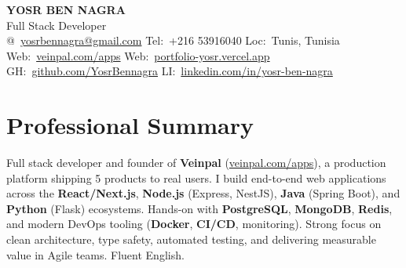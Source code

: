 \documentclass[10pt,a4paper]{article}
\makeatletter
\newcommand{\faEnvelope}{@}
\newcommand{\faPhone}{Tel:}
\newcommand{\faMapMarker}{Loc:}
\newcommand{\faGlobe}{Web:}
\newcommand{\faGithub}{GH:}
\newcommand{\faLinkedin}{LI:}
\makeatother
\begin{document}
\begin{center}
  {\LARGE\bfseries\color{primary} YOSR BEN NAGRA}\\[4pt]
  {\normalsize\color{accent} Full Stack Developer}\\[5pt]
  {\footnotesize
    \faEnvelope\ \href{mailto:yosrbennagra@gmail.com}{yosrbennagra@gmail.com} \;\textbar\;
    \faPhone\ +216 53916040 \;\textbar\;
    \faMapMarker\ Tunis, Tunisia \\[2pt]
    \faGlobe\ \href{https://veinpal.com/apps}{veinpal.com/apps} \;\textbar\;
    \faGlobe\ \href{https://portfolio-yosr.vercel.app/en}{portfolio-yosr.vercel.app} \;\textbar\;
    \faGithub\ \href{https://github.com/YosrBennagra}{github.com/YosrBennagra} \;\textbar\;
    \faLinkedin\ \href{https://www.linkedin.com/in/yosr-ben-nagra/}{linkedin.com/in/yosr-ben-nagra}
  }
\end{center}

\section*{Professional Summary}
{\small
Full stack developer and founder of \textbf{Veinpal} (\href{https://veinpal.com/apps}{veinpal.com/apps}), a production platform shipping 5 products to real users. I build end-to-end web applications across the \textbf{React/Next.js}, \textbf{Node.js} (Express, NestJS), \textbf{Java} (Spring Boot), and \textbf{Python} (Flask) ecosystems. Hands-on with \textbf{PostgreSQL}, \textbf{MongoDB}, \textbf{Redis}, and modern DevOps tooling (\textbf{Docker}, \textbf{CI/CD}, monitoring). Strong focus on clean architecture, type safety, automated testing, and delivering measurable value in Agile teams. Fluent English.
}

\end{document}
